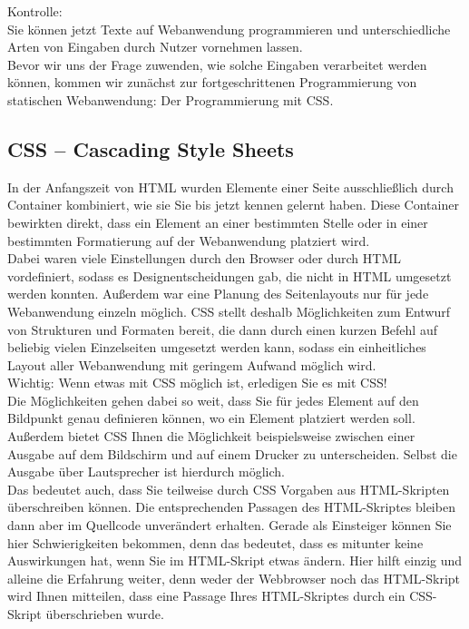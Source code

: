 Kontrolle:\\

Sie können jetzt Texte auf Webanwendung programmieren und unterschiedliche Arten von Eingaben durch Nutzer vornehmen lassen.\\

Bevor wir uns der Frage zuwenden, wie solche Eingaben verarbeitet werden können, kommen wir zunächst zur fortgeschrittenen Programmierung von statischen Webanwendung: Der Programmierung mit CSS.

\subsection{CSS – Cascading Style Sheets}

In der Anfangszeit von HTML wurden Elemente einer Seite ausschließlich durch Container kombiniert, wie sie Sie bis jetzt kennen gelernt haben. Diese Container bewirkten direkt, dass ein Element an einer bestimmten Stelle oder in einer bestimmten Formatierung auf der Webanwendung platziert wird.\\

Dabei waren viele Einstellungen durch den Browser oder durch HTML vordefiniert, sodass es Designentscheidungen gab, die nicht in HTML umgesetzt werden konnten. Außerdem war eine Planung des Seitenlayouts nur für jede Webanwendung einzeln möglich. CSS stellt deshalb Möglichkeiten zum Entwurf von Strukturen und Formaten bereit, die dann durch einen kurzen Befehl auf beliebig vielen Einzelseiten umgesetzt werden kann, sodass ein einheitliches Layout aller Webanwendung mit geringem Aufwand möglich wird.\\

Wichtig: Wenn etwas mit CSS möglich ist, erledigen Sie es mit CSS!\\

Die Möglichkeiten gehen dabei so weit, dass Sie für jedes Element auf den Bildpunkt genau definieren können, wo ein Element platziert werden soll. Außerdem bietet CSS Ihnen die Möglichkeit beispielsweise zwischen einer Ausgabe auf dem Bildschirm und auf einem Drucker zu unterscheiden. Selbst die Ausgabe über Lautsprecher ist hierdurch möglich.\\

Das bedeutet auch, dass Sie teilweise durch CSS Vorgaben aus HTML-Skripten überschreiben können.  Die entsprechenden Passagen des HTML-Skriptes bleiben dann aber im Quellcode unverändert erhalten. Gerade als Einsteiger können Sie hier Schwierigkeiten bekommen, denn das bedeutet, dass es mitunter keine Auswirkungen hat, wenn Sie im HTML-Skript etwas ändern. Hier hilft einzig und alleine die Erfahrung weiter, denn weder der Webbrowser noch das HTML-Skript wird Ihnen mitteilen, dass eine Passage Ihres HTML-Skriptes durch ein CSS-Skript überschrieben wurde.\\

